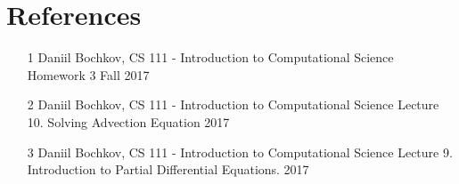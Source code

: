 \documentclass[12pt]{article}
\begin{document}
\section{References}\label{sec::References}
\begin{itemize}
\item [1] Daniil Bochkov, CS 111 - Introduction to Computational Science Homework 3 Fall 2017
\item [2] Daniil Bochkov, CS 111 - Introduction to Computational Science Lecture 10. Solving Advection Equation 2017
\item [3] Daniil Bochkov, CS 111 - Introduction to Computational Science Lecture 9. Introduction to Partial Differential Equations. 2017

\end{itemize}


\end{document}
